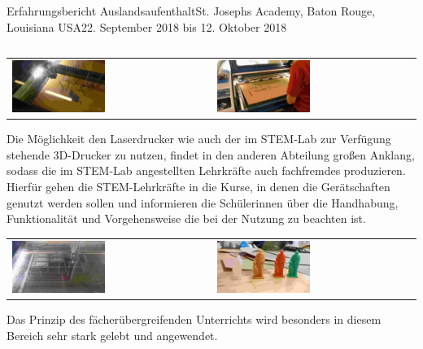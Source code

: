 \documentclass[oneside,openany,headings=optiontotoc,11pt,numbers=noenddot]{article}
\begin{document}
\begin{worksheet}{Erfahrungsbericht Auslandsaufenthalt}{St. Joseph\grq{}s Academy, Baton Rouge, Louisiana USA}{22. September 2018 bis 12. Oktober 2018}
\begin{center}
\begin{tabularx}{\textwidth}{XX}
			\end{tabularx}
			\begin{tabularx}{\textwidth}{XX}
				\includegraphics[width=0.48\textwidth]{../99_Bilder/00_laser.jpg} & \includegraphics[width=0.48\textwidth]{../99_Bilder/01_laser.jpg}
			\end{tabularx}
		\end{center}
		Die Möglichkeit den Laserdrucker wie auch der im STEM-Lab zur Verfügung stehende 3D-Drucker zu nutzen, findet in den anderen Abteilung großen Anklang, sodass die im STEM-Lab angestellten Lehrkräfte auch \grq{}fachfremdes\grq{} produzieren.\\
		Hierfür gehen die STEM-Lehrkräfte in die Kurse, in denen die Gerätschaften genutzt werden sollen und informieren die Schülerinnen über die Handhabung, Funktionalität und Vorgehensweise die bei der Nutzung zu beachten ist.
		\begin{center}
			\begin{tabularx}{\textwidth}{XX}
				\includegraphics[width=0.48\textwidth]{../99_Bilder/laser.jpg} & \includegraphics[width=0.48\textwidth]{../99_Bilder/3DPrint.jpg}
			\end{tabularx}
		\end{center}
		Das Prinzip des fächerübergreifenden Unterrichts wird besonders in diesem Bereich sehr stark gelebt und angewendet.

\end{worksheet}
\end{document}
